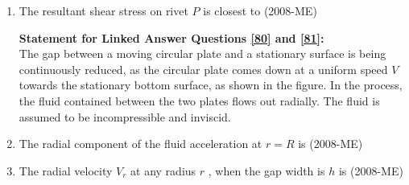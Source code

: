 \documentclass[journal]{IEEEtran}
\begin{document}
\begin{enumerate}
\begin{enumerate}
 \end{enumerate}
 \item The resultant shear stress on rivet $P$
 is closest to \label{79} \hfill(2008-ME)
 \begin{enumerate}
 \end{enumerate}
\textbf{Statement for Linked Answer Questions \ref{80} and \ref{81}:} \\
The gap between a moving circular plate and a stationary surface is being continuously reduced, as the circular plate comes down at a uniform speed $V$
 towards the stationary bottom surface, as shown in the figure. In the process, the fluid contained between the two plates flows out radially. The fluid is assumed to be incompressible and inviscid. 
 
 \item The radial component of the fluid acceleration at $r = R$
 is \label{80} \hfill(2008-ME)
 \begin{enumerate}
 \end{enumerate}
\item The radial velocity $V_r$
 at any radius $r$
, when the gap width is $h$
 is \label{81} \hfill(2008-ME)
 \begin{enumerate}
\end{enumerate}
\end{enumerate}
\end{document}
